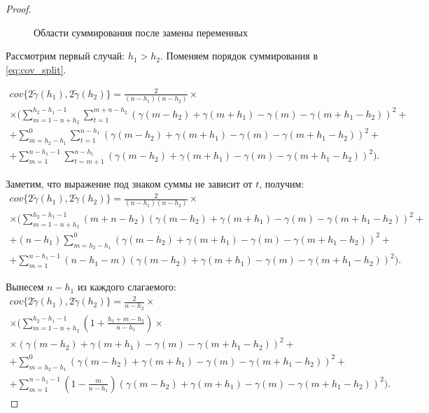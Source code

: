 \begin{proof}
\begin{figure}[H]
	\caption{Области суммирования после замены переменных}
	\label{fig:label}
\end{figure}

Рассмотрим первый случай: $h_1 > h_2$. Поменяем порядок суммирования в \eqref{eq:cov_split}.

\begin{equation*}\begin{gathered}
	cov\{ 2 \tilde{\gamma}(h_1), 2 \tilde{\gamma}(h_2) \} = \frac{2}{(n - h_1) (n - h_2)} \times \\
	\times (\sum_{m = 1 - n + h_2}^{h_2 - h_1 - 1}\sum_{t = 1}^{m + n - h_2}(\gamma(m - h_2) + \gamma(m + h_1) - \gamma(m) - \gamma(m + h_1 - h_2))^2 + \\
	+ \sum_{m = h_2 - h_1}^{0}\sum_{t = 1}^{n - h_1}(\gamma(m - h_2) + \gamma(m + h_1) - \gamma(m) - \gamma(m + h_1 - h_2))^2 + \\
	+ \sum_{m = 1}^{n - h_1 - 1}\sum_{t = m + 1}^{n - h_1}(\gamma(m - h_2) + \gamma(m + h_1) - \gamma(m) - \gamma(m + h_1 - h_2))^2).
\end{gathered}\end{equation*}

Заметим, что выражение под знаком суммы не зависит от $t$, получим:
\begin{equation*}\begin{gathered}
	cov\{ 2 \tilde{\gamma}(h_1), 2 \tilde{\gamma}(h_2) \} = \frac{2}{(n - h_1) (n - h_2)} \times \\
	\times (\sum_{m = 1 - n + h_2}^{h_2 - h_1 - 1}(m + n - h_2)(\gamma(m - h_2) + \gamma(m + h_1) - \gamma(m) - \gamma(m + h_1 - h_2))^2 + \\
	+ (n - h_1)\sum_{m = h_2 - h_1}^{0}(\gamma(m - h_2) + \gamma(m + h_1) - \gamma(m) - \gamma(m + h_1 - h_2))^2 + \\
	+ \sum_{m = 1}^{n - h_1 - 1}(n - h_1 - m)(\gamma(m - h_2) + \gamma(m + h_1) - \gamma(m) - \gamma(m + h_1 - h_2))^2).
\end{gathered}\end{equation*}

Вынесем $ n - h_1 $ из каждого слагаемого:
\begin{equation*}\begin{gathered}
	cov\{ 2 \tilde{\gamma}(h_1), 2 \tilde{\gamma}(h_2) \} = \frac{2}{n - h_2} \times \\
	\times (\sum_{m = 1 - n + h_2}^{h_2 - h_1 - 1} (1 + \frac{h_1 + m - h_2}{n - h_1}) \times \\
	\times (\gamma(m - h_2) + \gamma(m + h_1) - \gamma(m) - \gamma(m + h_1 - h_2))^2 + \\
	+ \sum_{m = h_2 - h_1}^{0}(\gamma(m - h_2) + \gamma(m + h_1) - \gamma(m) - \gamma(m + h_1 - h_2))^2 + \\
	+ \sum_{m = 1}^{n - h_1 - 1}(1 - \frac{m}{n - h_1})(\gamma(m - h_2) + \gamma(m + h_1) - \gamma(m) - \gamma(m + h_1 - h_2))^2).
\end{gathered}\end{equation*}


\end{proof}
